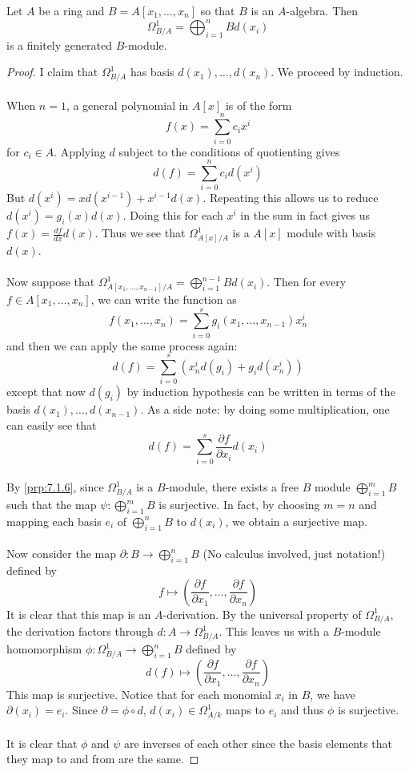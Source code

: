 \documentclass[a4paper]{article}
\begin{document}
\begin{lmm}{}{} Let $A$ be a ring and $B=A[x_1,\dots,x_n]$ so that $B$ is an $A$-algebra. Then $$\Omega_{B/A}^1=\bigoplus_{i=1}^nBd(x_i)$$ 
is a finitely generated $B$-module. 
\begin{proof}
I claim that  $\Omega_{B/A}^1$ has basis $d(x_1),\dots,d(x_n)$. 
We proceed by induction. \\~\\

When $n=1$, a general polynomial in $A[x]$ is of the form $$f(x)=\sum_{i=0}^nc_ix^i$$ for $c_i\in A$. Applying $d$ subject to the conditions of quotienting gives $$d(f)=\sum_{i=0}^nc_id(x^i)$$ But $d(x^i)=xd(x^{i-1})+x^{i-1}d(x)$. Repeating this allows us to reduce $d(x^i)=g_i(x)d(x)$. Doing this for each $x^i$ in the sum in fact gives us $f(x)=\frac{df}{dx}d(x)$. Thus we see that $\Omega_{A[x]/A}^1$ is a $A[x]$ module with basis $d(x)$. \\~\\

Now suppose that $\Omega_{A[x_1,\dots,x_{n-1}]/A}^1=\bigoplus_{i=1}^{n-1}Bd(x_i)$. Then for every $f\in A[x_1,\dots,x_n]$, we can write the function as $$f(x_1,\dots,x_n)=\sum_{i=0}^sg_i(x_1,\dots,x_{n-1})x_n^i$$ and then we can apply the same process again: $$d(f)=\sum_{i=0}^s(x_n^id(g_i)+g_id(x_n^i))$$ except that now $d(g_i)$ by induction hypothesis can be written in terms of the basis $d(x_1),\dots,d(x_{n-1})$. As a side note: by doing some multiplication, one can easily see that $$d(f)=\sum_{i=0}^s\frac{\partial f}{\partial x_i}d(x_i)$$~\\

By \ref{prp:7.1.6}, since $\Omega_{B/A}^1$ is a $B$-module, there exists a free $B$ module $\bigoplus_{i=1}^mB$ such that the map $\psi:\bigoplus_{i=1}^mB$ is surjective. In fact, by choosing $m=n$ and mapping each basis $e_i$ of $\bigoplus_{i=1}^nB$ to $d(x_i)$, we obtain a surjective map. \\~\\

Now consider the map $\partial:B\to\bigoplus_{i=1}^nB$ (No calculus involved, just notation!) defined by $$f\mapsto\left(\frac{\partial f}{\partial x_1},\dots,\frac{\partial f}{\partial x_n}\right)$$ It is clear that this map is an $A$-derivation. By the universal property of $\Omega_{B/A}^1$, the derivation factors through $d:A\to\Omega_{B/A}^1$. This leaves us with a $B$-module homomorphism $\phi:\Omega_{B/A}^1\to\bigoplus_{i=1}^nB$ defined by $$d(f)\mapsto\left(\frac{\partial f}{\partial x_1},\dots,\frac{\partial f}{\partial x_n}\right)$$ This map is surjective. Notice that for each monomial $x_i$ in $B$, we have $\partial(x_i)=e_i$. Since $\partial=\phi\circ d$, $d(x_i)\in\Omega_{A/k}^1$ maps to $e_i$ and thus $\phi$ is surjective. \\~\\

It is clear that $\phi$ and $\psi$ are inverses of each other since the basis elements that they map to and from are the same. 
\end{proof}
\end{lmm}
\end{document}

